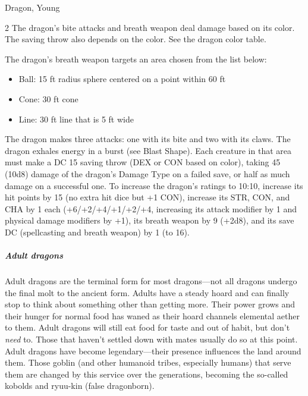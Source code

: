 \begin{DndMonster}[width=\textwidth + 8pt]{Dragon, Young}
\begin{multicols}{2}
 The dragon's bite attacks and breath weapon deal damage based on its color. The saving throw also depends on the color. See the dragon color table.

 The dragon's breath weapon targets an area chosen from the list below:
\begin{itemize}
	\item[] Ball: 15 ft radius sphere centered on a point within 60 ft
	\item[] Cone: 30 ft cone
	\item[] Line: 30 ft line that is 5 ft wide
\end{itemize}

 The dragon makes three attacks: one with its bite and two with its claws.
\DndMonsterAttack[
	name=Bite,
	distance=melee,
	type=weapon,
	mod=+8,
	reach=10,
	dmg=\DndDice{2d10 + 5},
	dmg-type=piercing,
	extra={ plus 4 (1d8) damage of the dragon's Damage Type.}
]
\DndMonsterAttack[
	name=Claw,
	distance=melee,
	type=weapon,
	mod=+8,
	reach=5,
	dmg=\DndDice{2d6 + 5},
	dmg-type=slashing
]
The dragon exhales energy in a burst (see Blast Shape). Each creature in that area must make a DC 15 saving throw (DEX or CON based on color), taking 45 (10d8) damage of the dragon's Damage Type on a failed save, or half as much damage on a successful one.
To increase the dragon's ratings to 10:10, increase its hit points by 15 (no extra hit dice but +1 CON), increase its STR, CON, and CHA by 1 each (+6/+2/+4/+1/+2/+4, increasing its attack modifier by 1 and physical damage modifiers by +1), its breath weapon by 9 (+2d8), and its save DC (spellcasting and breath weapon) by 1 (to 16).
\end{multicols}
\end{DndMonster}

\subparagraph*{Adult dragons}
Adult dragons are the terminal form for most dragons---not all dragons undergo the final molt to the ancient form. Adults have a steady hoard and can finally stop to think about something other than getting more. Their power grows and their hunger for normal food has waned as their hoard channels elemental aether to them. Adult dragons will still eat food for taste and out of habit, but don't \textit{need} to. Those that haven't settled down with mates usually do so at this point. Adult dragons have become legendary---their presence influences the land around them. Those goblin (and other humanoid tribes, especially humans) that serve them are changed by this service over the generations, becoming the so-called kobolds and ryuu-kin (false dragonborn).

